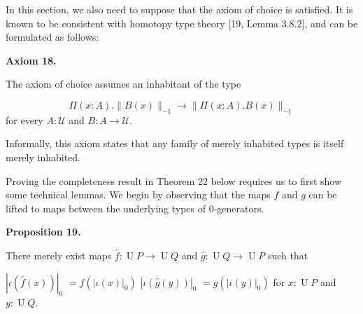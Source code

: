 \documentclass[10pt,a4paper]{amsart}
\begin{document}
 
 
In this section, we also need to suppose that the axiom of choice is satisfied. It is known to be consistent with homotopy type theory [19, Lemma 3.8.2], and can be formulated as follows:\par
 
 
 
\par\medskip\noindent\textbf{Axiom 18.}\par
 
 
The axiom of choice assumes an inhabitant of the type\par
    \[\Pi(x:A).\|B(x)\|_{-1}\to\|\Pi(x:A).B(x)\|_{-1}\]    
for every $A:\mathcal{U}$ and $B:A\to\mathcal{U}$.\par
 
 
 
 
Informally, this axiom states that any family of merely inhabited types is itself merely inhabited.\par
 
 
 
Proving the completeness result in Theorem 22 below requires us to first show some technical lemmas. We begin by observing that the maps $f$ and $g$ can be lifted to maps between the underlying types of 0-generators.\par
 
 
 
\par\medskip\noindent\textbf{Proposition 19.}\par
 
 
There merely exist maps $\hat{f}:\operatorname{U}P\to\operatorname{U}Q$ and $\hat{g}:\operatorname{U}Q\to\operatorname{U}P$ such that\par
    $\displaystyle|\iota(\hat{f}(x))|_{0}$ $\displaystyle=f(|\iota(x)|_{0})$ $\displaystyle|\iota(\hat{g}(y))|_{0}$ $\displaystyle=g(|\iota(y)|_{0})$    
for $x:\operatorname{U}P$ and $y:\operatorname{U}Q$.\par
 
\end{document}

